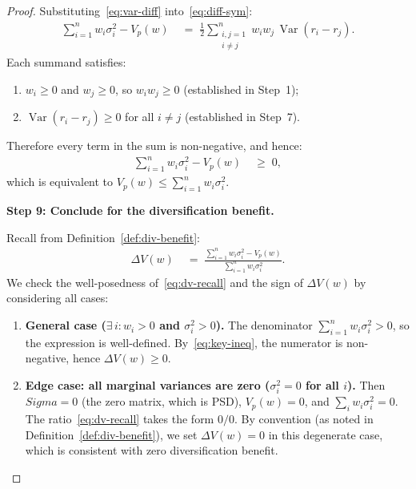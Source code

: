 \documentclass[12pt,openany]{book}
\newcommand{\bfw}{\mathbf{w}}
\newcommand{\bfSigma}{\boldsymbol{\Sigma}}
\DeclareMathOperator{\Var}{Var}
\numberwithin{equation}{chapter}
\theoremstyle{plain}
\theoremstyle{definition}
\theoremstyle{remark}
\def\bfw{w}%
\def\bfSigma{Sigma}%
\begin{document}
\begin{proof}
\medskip
\noindent Substituting~\eqref{eq:var-diff} into~\eqref{eq:diff-sym}:
\begin{align}
  \sum_{i=1}^n w_i \sigma_i^2 - V_p(\bfw)
  &\;=\; \frac{1}{2}
         \sum_{\substack{i,j=1\\i\neq j}}^n
         w_i w_j\, \Var(r_i - r_j).
  \label{eq:div-pf}
\end{align}
Each summand satisfies:
\begin{enumerate}[label=(\roman*)]
  \item $w_i \geq 0$ and $w_j \geq 0$, so $w_i w_j \geq 0$
        (established in Step~1);
  \item $\Var(r_i - r_j) \geq 0$ for all $i \neq j$
        (established in Step~7).
\end{enumerate}
Therefore every term in the sum is non-negative, and hence:
\begin{align}
  \sum_{i=1}^n w_i \sigma_i^2 - V_p(\bfw)
  &\;\geq\; 0,
  \label{eq:key-ineq}
\end{align}
which is equivalent to $V_p(\bfw) \leq \sum_{i=1}^n w_i \sigma_i^2$.

\medskip
\noindent\textbf{Step 9: Conclude for the diversification benefit.}

\medskip
\noindent Recall from Definition~\ref{def:div-benefit}:
\begin{align}
  \Delta V(\bfw)
  &\;=\;
  \frac{\displaystyle\sum_{i=1}^n w_i \sigma_i^2 - V_p(\bfw)}
       {\displaystyle\sum_{i=1}^n w_i \sigma_i^2}.
  \label{eq:dv-recall}
\end{align}
We check the well-posedness of~\eqref{eq:dv-recall} and the sign of
$\Delta V(\bfw)$ by considering all cases:

\begin{enumerate}[label=(\alph*)]
  \item \textbf{General case ($\exists\, i : w_i > 0$ and
        $\sigma_i^2 > 0$).}\;
        The denominator $\sum_{i=1}^n w_i \sigma_i^2 > 0$, so the
        expression is well-defined.  By~\eqref{eq:key-ineq},
        the numerator is non-negative, hence $\Delta V(\bfw) \geq 0$.

  \item \textbf{Edge case: all marginal variances are zero
        ($\sigma_i^2 = 0$ for all $i$).}\;
        Then $\bfSigma = 0$ (the zero matrix, which is PSD),
        $V_p(\bfw) = 0$, and $\sum_i w_i \sigma_i^2 = 0$.
        The ratio~\eqref{eq:dv-recall} takes the form $0/0$.
        By convention (as noted in Definition~\ref{def:div-benefit}),
        we set $\Delta V(\bfw) = 0$ in this degenerate case,
        which is consistent with zero diversification benefit.


\end{enumerate}
\end{proof}
\end{document}

